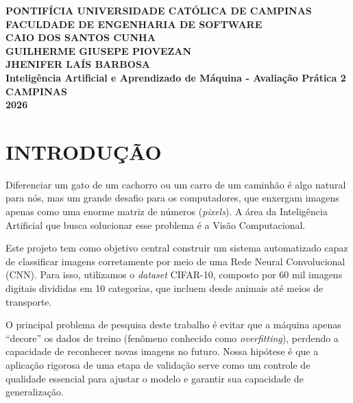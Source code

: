 \documentclass[12pt,a4paper]{article}
\begin{document}
\begin{titlepage}
    \begin{center}
        \large\textbf{PONTIFÍCIA UNIVERSIDADE CATÓLICA DE CAMPINAS}\\
        \large\textbf{FACULDADE DE ENGENHARIA DE SOFTWARE}\\
        \vspace{4cm}
        \large\textbf{CAIO DOS SANTOS CUNHA}\\
        \large\textbf{GUILHERME GIUSEPE PIOVEZAN}\\
        \large\textbf{JHENIFER LAÍS BARBOSA}\\
        \vspace{4cm}
        \Large\textbf{Inteligência Artificial e Aprendizado de Máquina - Avaliação Prática 2}\\
        \vfill
        \large\textbf{CAMPINAS}\\
        \large\textbf{2026}
    \end{center}
\end{titlepage}

\newpage
\thispagestyle{empty}
\tableofcontents
\cleardoublepage


\section{INTRODUÇÃO}

Diferenciar um gato de um cachorro ou um carro de um caminhão é algo natural para nós, mas um grande desafio para os computadores, que enxergam imagens apenas como uma enorme matriz de números (\textit{pixels}). A área da Inteligência Artificial que busca solucionar esse problema é a Visão Computacional. 

Este projeto tem como objetivo central construir um sistema automatizado capaz de classificar imagens corretamente por meio de uma Rede Neural Convolucional (CNN). Para isso, utilizamos o \textit{dataset} CIFAR-10, composto por 60 mil imagens digitais divididas em 10 categorias, que incluem desde animais até meios de transporte.

O principal problema de pesquisa deste trabalho é evitar que a máquina apenas ``decore'' os dados de treino (fenômeno conhecido como \textit{overfitting}), perdendo a capacidade de reconhecer novas imagens no futuro. Nossa hipótese é que a aplicação rigorosa de uma etapa de validação serve como um controle de qualidade essencial para ajustar o modelo e garantir sua capacidade de generalização.
\end{document}
